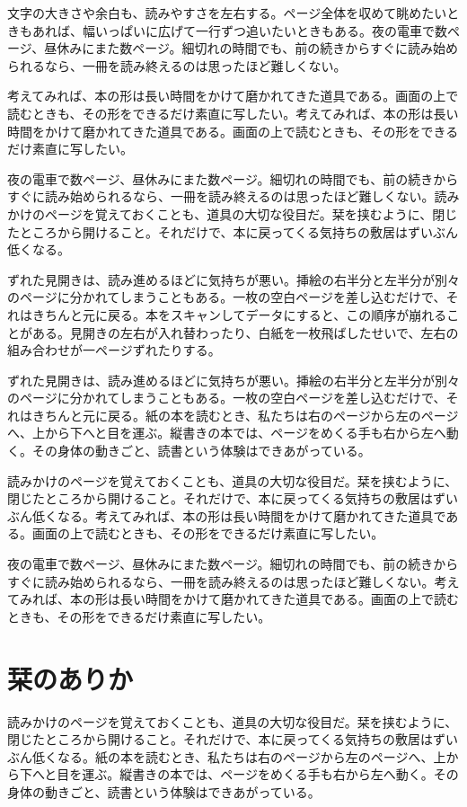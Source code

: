 \documentclass[a5paper,11pt]{ltjtbook}
\begin{document}
文字の大きさや余白も、読みやすさを左右する。ページ全体を収めて眺めたいときもあれば、幅いっぱいに広げて一行ずつ追いたいときもある。夜の電車で数ページ、昼休みにまた数ページ。細切れの時間でも、前の続きからすぐに読み始められるなら、一冊を読み終えるのは思ったほど難しくない。

考えてみれば、本の形は長い時間をかけて磨かれてきた道具である。画面の上で読むときも、その形をできるだけ素直に写したい。考えてみれば、本の形は長い時間をかけて磨かれてきた道具である。画面の上で読むときも、その形をできるだけ素直に写したい。

夜の電車で数ページ、昼休みにまた数ページ。細切れの時間でも、前の続きからすぐに読み始められるなら、一冊を読み終えるのは思ったほど難しくない。読みかけのページを覚えておくことも、道具の大切な役目だ。栞を挟むように、閉じたところから開けること。それだけで、本に戻ってくる気持ちの敷居はずいぶん低くなる。

ずれた見開きは、読み進めるほどに気持ちが悪い。挿絵の右半分と左半分が別々のページに分かれてしまうこともある。一枚の空白ページを差し込むだけで、それはきちんと元に戻る。本をスキャンしてデータにすると、この順序が崩れることがある。見開きの左右が入れ替わったり、白紙を一枚飛ばしたせいで、左右の組み合わせが一ページずれたりする。

ずれた見開きは、読み進めるほどに気持ちが悪い。挿絵の右半分と左半分が別々のページに分かれてしまうこともある。一枚の空白ページを差し込むだけで、それはきちんと元に戻る。紙の本を読むとき、私たちは右のページから左のページへ、上から下へと目を運ぶ。縦書きの本では、ページをめくる手も右から左へ動く。その身体の動きごと、読書という体験はできあがっている。

読みかけのページを覚えておくことも、道具の大切な役目だ。栞を挟むように、閉じたところから開けること。それだけで、本に戻ってくる気持ちの敷居はずいぶん低くなる。考えてみれば、本の形は長い時間をかけて磨かれてきた道具である。画面の上で読むときも、その形をできるだけ素直に写したい。

夜の電車で数ページ、昼休みにまた数ページ。細切れの時間でも、前の続きからすぐに読み始められるなら、一冊を読み終えるのは思ったほど難しくない。考えてみれば、本の形は長い時間をかけて磨かれてきた道具である。画面の上で読むときも、その形をできるだけ素直に写したい。

\chapter{栞のありか}
読みかけのページを覚えておくことも、道具の大切な役目だ。栞を挟むように、閉じたところから開けること。それだけで、本に戻ってくる気持ちの敷居はずいぶん低くなる。紙の本を読むとき、私たちは右のページから左のページへ、上から下へと目を運ぶ。縦書きの本では、ページをめくる手も右から左へ動く。その身体の動きごと、読書という体験はできあがっている。
\end{document}
